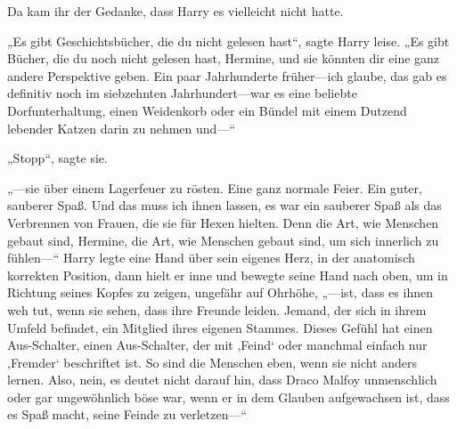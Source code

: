 Da kam ihr der Gedanke, dass Harry es vielleicht nicht hatte.

„Es gibt Geschichtsbücher, die du nicht gelesen hast“, sagte Harry leise. „Es gibt Bücher, die du noch nicht gelesen hast, Hermine, und sie könnten dir eine ganz andere Perspektive geben. Ein paar Jahrhunderte früher—ich glaube, das gab es definitiv noch im siebzehnten Jahrhundert—war es eine beliebte Dorfunterhaltung, einen Weidenkorb oder ein Bündel mit einem Dutzend lebender Katzen darin zu nehmen und—“

„Stopp“, sagte sie.

„—sie über einem Lagerfeuer zu rösten. Eine ganz normale Feier. Ein guter, sauberer Spaß. Und das muss ich ihnen lassen, es war ein sauberer Spaß als das Verbrennen von Frauen, die sie für Hexen hielten. Denn die Art, wie Menschen gebaut sind, Hermine, die Art, wie Menschen gebaut sind, um sich innerlich zu fühlen—“ Harry legte eine Hand über sein eigenes Herz, in der anatomisch korrekten Position, dann hielt er inne und bewegte seine Hand nach oben, um in Richtung seines Kopfes zu zeigen, ungefähr auf Ohrhöhe, „—ist, dass es ihnen weh tut, wenn sie sehen, dass ihre Freunde leiden. Jemand, der sich in ihrem Umfeld befindet, ein Mitglied ihres eigenen Stammes. Dieses Gefühl hat einen Aus-Schalter, einen Aus-Schalter, der mit ‚Feind‘ oder manchmal einfach nur ‚Fremder‘ beschriftet ist. So sind die Menschen eben, wenn sie nicht anders lernen. Also, nein, es deutet nicht darauf hin, dass Draco Malfoy unmenschlich oder gar ungewöhnlich böse war, wenn er in dem Glauben aufgewachsen ist, dass es Spaß macht, seine Feinde zu verletzen—“

